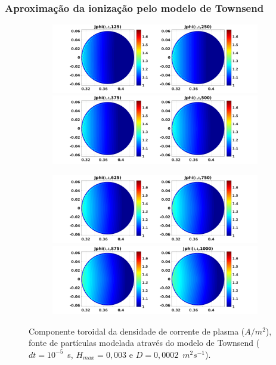 \documentclass[aspectratio=169]{beamer}
\begin{document}
	\begin{frame}		
\frametitle{Aproximação da ionização pelo modelo de Townsend}

\begin{figure}[H]
\begin{subfigure}{0.43\textwidth}
\includegraphics[scale=0.24]{../SImulacao_breakdown/PDE/Jphitod1B2.png}  
\includegraphics[scale=0.24]{../SImulacao_breakdown/PDE/Jphitod2B2.png} 
\end{subfigure}
\begin{subfigure}{0.43\textwidth}
\includegraphics[scale=0.24]{../SImulacao_breakdown/PDE/Jphitod3B2.png} 
\includegraphics[scale=0.24]{../SImulacao_breakdown/PDE/Jphitod4B2.png} 
\end{subfigure}	
\caption{Componente toroidal da densidade de corrente de plasma ($A/m^2$), fonte de partículas modelada através do modelo de Townsend ($dt=10^{-5}$\ s, $H_{max} = 0,003$ e $D=0,0002$\ $m^2s^{-1}$).}
\end{figure}
\end{frame}
\end{document}
